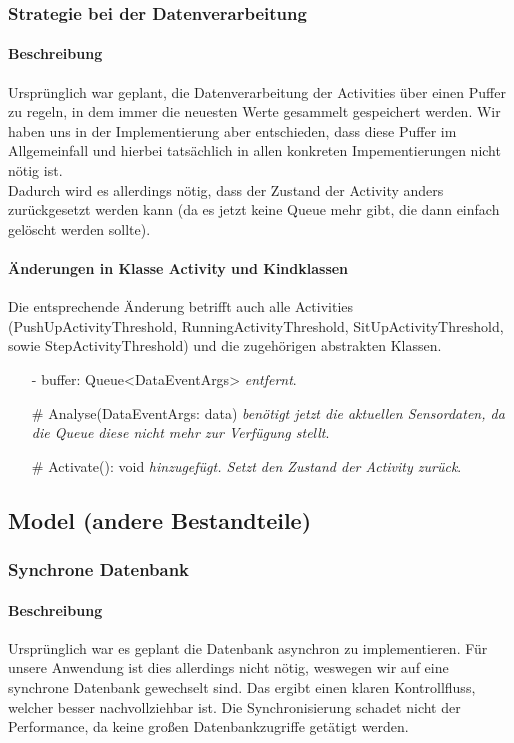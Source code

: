 \documentclass[a4paper,12pt]{article}
\begin{document}
\subsubsection{Strategie bei der Datenverarbeitung}
\paragraph{Beschreibung}
Ursprünglich war geplant, die Datenverarbeitung der Activities über einen Puffer zu regeln, in dem immer die neuesten Werte gesammelt gespeichert werden. Wir haben uns in der Implementierung aber entschieden, dass diese Puffer im Allgemeinfall und hierbei tatsächlich in allen konkreten Impementierungen nicht nötig ist.\\
Dadurch wird es allerdings nötig, dass der Zustand der Activity anders zurückgesetzt werden kann (da es jetzt keine Queue mehr gibt, die dann einfach gelöscht werden sollte).
\paragraph{Änderungen in Klasse Activity und Kindklassen}
Die entsprechende Änderung betrifft auch alle Activities (PushUpActivityThreshold, RunningActivityThreshold, SitUpActivityThreshold, sowie StepActivityThreshold) und die zugehörigen abstrakten Klassen.
\begin{itemize}
	\item [-] buffer: Queue<DataEventArgs> \textit{entfernt}.
	\item [\#] Analyse(DataEventArgs: data) \textit{benötigt jetzt die aktuellen Sensordaten, da die Queue diese nicht mehr zur Verfügung stellt}.
	\item [\#] Activate(): void \textit{hinzugefügt. Setzt den Zustand der Activity zurück}.
\end{itemize}
\subsection{Model (andere Bestandteile)}

\subsubsection{Synchrone Datenbank}
\paragraph{Beschreibung}
Ursprünglich war es geplant die Datenbank asynchron zu implementieren. Für unsere Anwendung ist dies allerdings nicht nötig, weswegen wir auf eine synchrone Datenbank gewechselt sind. Das ergibt einen klaren Kontrollfluss, welcher besser nachvollziehbar ist. Die Synchronisierung schadet nicht der Performance, da keine großen Datenbankzugriffe getätigt werden.
\end{document}
